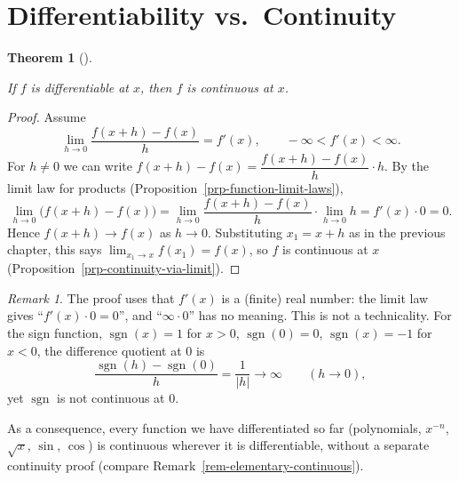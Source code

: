 \documentclass[
  letterpaper,
  DIV=11,
  numbers=noendperiod]{scrreprt}
\theoremstyle{plain}
\theoremstyle{plain}
\theoremstyle{definition}
\theoremstyle{definition}
\theoremstyle{definition}
\theoremstyle{plain}
\newtheorem{theorem}{Theorem}[chapter]
\theoremstyle{plain}
\theoremstyle{remark}
\newtheorem{refremark}{Remark}[chapter]
\begin{document}
\section{Differentiability
vs.~Continuity}\label{differentiability-vs.-continuity}

\begin{theorem}[]\protect\hypertarget{thm-differentiable-continuous}{}\label{thm-differentiable-continuous}

\hfill\break
If \(f\) is differentiable at \(x\), then \(f\) is continuous at \(x\).

\end{theorem}

\begin{proof}
Assume \[
\lim_{h\to0}\frac{f(x+h)-f(x)}{h} = f'(x), \qquad -\infty < f'(x) < \infty .
\] For \(h\neq 0\) we can write
\(f(x+h)-f(x) = \dfrac{f(x+h)-f(x)}{h}\cdot h\). By the limit law for
products (Proposition~\ref{prp-function-limit-laws}), \[
\lim_{h\to0}\big(f(x+h)-f(x)\big)
= \lim_{h\to0}\frac{f(x+h)-f(x)}{h}\cdot\lim_{h\to0} h = f'(x)\cdot 0 = 0 .
\] Hence \(f(x+h)\to f(x)\) as \(h\to0\). Substituting \(x_1=x+h\) as in
the previous chapter, this says \(\lim_{x_1\to x}f(x_1) = f(x)\), so
\(f\) is continuous at \(x\)
(Proposition~\ref{prp-continuity-via-limit}).
\end{proof}

\begin{refremark}
The proof uses that \(f'(x)\) is a (finite) real number: the limit law
gives ``\(f'(x)\cdot 0 = 0\)'', and ``\(\infty\cdot0\)'' has no meaning.
This is not a technicality. For the sign function,
\(\operatorname{sgn}(x) = 1\) for \(x>0\), \(\operatorname{sgn}(0)=0\),
\(\operatorname{sgn}(x)=-1\) for \(x<0\), the difference quotient at
\(0\) is \[
\frac{\operatorname{sgn}(h)-\operatorname{sgn}(0)}{h} = \frac{1}{\lvert h \rvert} \longrightarrow \infty
\qquad (h\to 0),
\] yet \(\operatorname{sgn}\) is not continuous at \(0\).

\label{rem-finite-derivative}

\end{refremark}

As a consequence, every function we have differentiated so far
(polynomials, \(x^{-n}\), \(\sqrt x\), \(\sin\), \(\cos\)) is continuous
wherever it is differentiable, without a separate continuity proof
(compare Remark~\ref{rem-elementary-continuous}).
\end{document}
